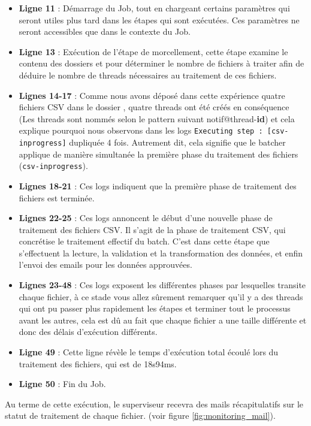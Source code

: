 \begin{itemize}
    \item \textbf{Ligne 11} : Démarrage du Job, tout en chargeant certains paramètres qui seront utiles plus tard dans les étapes qui sont exécutées. Ces paramètres ne seront accessibles que dans le contexte du Job.
    \item \textbf{Ligne 13} : Exécution de l'étape de morcellement, cette étape examine le contenu des dossiers  et  pour déterminer le nombre de fichiers à traiter afin de déduire le nombre de threads nécessaires au traitement de ces fichiers.
    \item \textbf{Lignes 14-17} : Comme nous avons déposé dans cette expérience quatre fichiers CSV dans le dossier , quatre threads ont été créés en conséquence (Les threads sont nommés selon le pattern suivant notif@thread-\textbf{id}) et cela explique pourquoi nous observons dans les logs \lstinline|Executing step : [csv-inprogress]| dupliquée 4 fois. Autrement dit, cela signifie que le batcher applique de manière simultanée la première phase du traitement des fichiers (\lstinline|csv-inprogress|).
    \item \textbf{Lignes 18-21} : Ces logs indiquent que la première phase de traitement des fichiers est terminée.
    \item \textbf{Lignes 22-25} : Ces logs annoncent le début d'une nouvelle phase de traitement des fichiers CSV. Il s'agit de la phase de traitement CSV, qui concrétise le traitement effectif du batch. C'est dans cette étape que s'effectuent la lecture, la validation et la transformation des données, et enfin l'envoi des emails pour les données approuvées.
    \item \textbf{Lignes 23-48} : Ces logs exposent les différentes phases par lesquelles transite chaque fichier, à ce stade vous allez sûrement remarquer qu'il y a des threads qui ont pu passer plus rapidement les étapes et terminer tout le processus avant les autres, cela est dû au fait que chaque fichier a une taille différente et donc des délais d'exécution différents.
    \item \textbf{Ligne 49} : Cette ligne révèle le temps d'exécution total écoulé lors du traitement des fichiers, qui est de 18s94ms. 
    \item \textbf{Ligne 50} : Fin du Job. 
\end{itemize}
Au terme de cette exécution, le superviseur recevra des mails récapitulatifs sur le statut de traitement de chaque fichier. (voir figure \ref{fig:monitoring_mail}).
